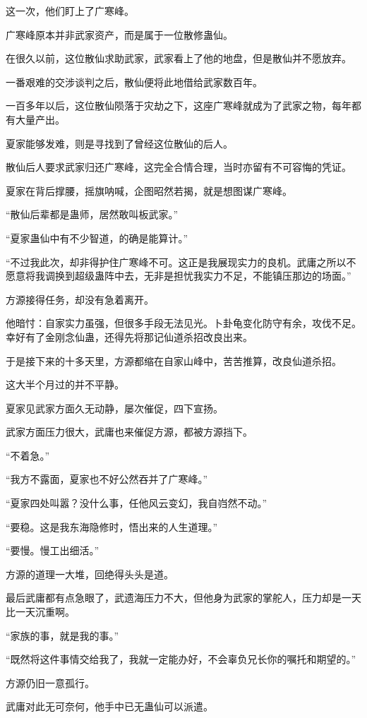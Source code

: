 \begin{this_body}
这一次，他们盯上了广寒峰。

广寒峰原本并非武家资产，而是属于一位散修蛊仙。

在很久以前，这位散仙求助武家，武家看上了他的地盘，但是散仙并不愿放弃。

一番艰难的交涉谈判之后，散仙便将此地借给武家数百年。

一百多年以后，这位散仙陨落于灾劫之下，这座广寒峰就成为了武家之物，每年都有大量产出。

夏家能够发难，则是寻找到了曾经这位散仙的后人。

散仙后人要求武家归还广寒峰，这完全合情合理，当时亦留有不可容悔的凭证。

夏家在背后撑腰，摇旗呐喊，企图昭然若揭，就是想图谋广寒峰。

“散仙后辈都是蛊师，居然敢叫板武家。”

“夏家蛊仙中有不少智道，的确是能算计。”

“不过我此次，却非得护住广寒峰不可。这正是我展现实力的良机。武庸之所以不愿意将我调换到超级蛊阵中去，无非是担忧我实力不足，不能镇压那边的场面。”

方源接得任务，却没有急着离开。

他暗忖：自家实力虽强，但很多手段无法见光。卜卦龟变化防守有余，攻伐不足。幸好有了金刚念仙蛊，还得先将那记仙道杀招改良出来。

于是接下来的十多天里，方源都缩在自家山峰中，苦苦推算，改良仙道杀招。

这大半个月过的并不平静。

夏家见武家方面久无动静，屡次催促，四下宣扬。

武家方面压力很大，武庸也来催促方源，都被方源挡下。

“不着急。”

“我方不露面，夏家也不好公然吞并了广寒峰。”

“夏家四处叫嚣？没什么事，任他风云变幻，我自岿然不动。”

“要稳。这是我东海隐修时，悟出来的人生道理。”

“要慢。慢工出细活。”

方源的道理一大堆，回绝得头头是道。

最后武庸都有点急眼了，武遗海压力不大，但他身为武家的掌舵人，压力却是一天比一天沉重啊。

“家族的事，就是我的事。”

“既然将这件事情交给我了，我就一定能办好，不会辜负兄长你的嘱托和期望的。”

方源仍旧一意孤行。

武庸对此无可奈何，他手中已无蛊仙可以派遣。


\end{this_body}
